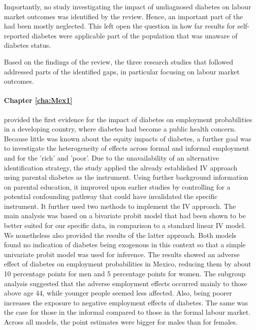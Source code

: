 Importantly, no study investigating the impact of undiagnosed diabetes on labour market outcomes was identified by the review. Hence, an important part of the \DIFdelbegin {}\DIFdelend \DIFaddbegin {}\DIFaddend had been mostly neglected. This left open the question in how far results for self-reported diabetes were applicable \DIFdelbegin {}\DIFdelend \DIFaddbegin {}\DIFaddend part of the population that was unaware of \DIFdelbegin {}\DIFdelend \DIFaddbegin {}\DIFaddend diabetes status.

Based on the findings of the review, the three research studies that followed addressed parts of the identified gaps, in particular focusing on labour market outcomes. 

\paragraph{Chapter \ref{cha:Mex1}} provided the first evidence for the impact of diabetes on employment probabilities in a developing country, where diabetes had become a public health concern. Because little was known about the equity impacts of diabetes, a further goal was to investigate the heterogeneity of effects across formal and informal employment and for the 'rich' and 'poor'. Due to the unavailability of an alternative identification strategy, the study applied the already established \ac{IV} approach using parental diabetes as the instrument. Using further background information on parental education, it improved upon earlier studies by controlling for a potential confounding pathway that could have invalidated the specific instrument. It further used two methods to implement the \ac{IV} approach. The main analysis was based on a bivariate probit model that had been shown to be better suited for our specific data, in comparison to a standard linear \ac{IV} model. We nonetheless also provided the results of the latter approach. Both models found no indication of diabetes being exogenous in this context so that a simple univariate probit model was used for inference. The results showed an adverse effect of diabetes on employment probabilities in Mexico, reducing them by about 10 percentage points for men and 5 percentage points for women. The subgroup analysis suggested that the adverse employment effects occurred mainly to those above age 44, while younger people seemed less affected. Also, being poorer increases the exposure to negative employment effects of diabetes. The same was the case for those in the informal compared to those in the formal labour market. Across all models, the point estimates were bigger for males than for females. 

